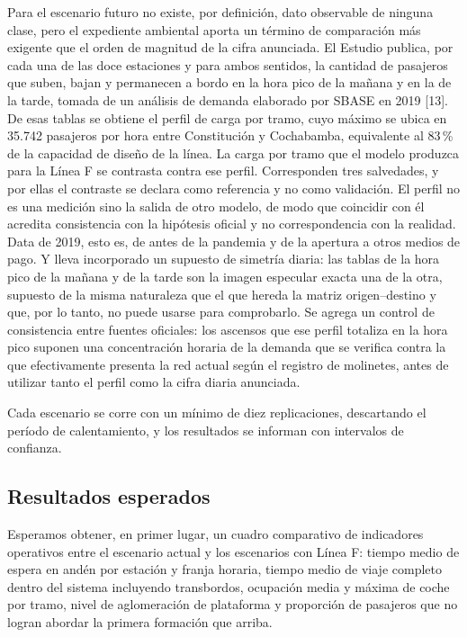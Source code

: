 \documentclass{article}
\begin{document}
Para el escenario futuro no existe, por definición, dato observable de ninguna clase, pero el expediente
ambiental aporta un término de comparación más exigente que el orden de magnitud de la cifra anunciada. El
Estudio publica, por cada una de las doce estaciones y para ambos sentidos, la cantidad de pasajeros que
suben, bajan y permanecen a bordo en la hora pico de la mañana y en la de la tarde, tomada de un análisis de
demanda elaborado por SBASE en 2019 [13]. De esas tablas se obtiene el perfil de carga por tramo, cuyo
máximo se ubica en 35.742 pasajeros por hora entre Constitución y Cochabamba, equivalente al 83\,\% de la
capacidad de diseño de la línea. La carga por tramo que el modelo produzca para la Línea F se contrasta
contra ese perfil. Corresponden tres salvedades, y por ellas el contraste se declara como referencia y no
como validación. El perfil no es una medición sino la salida de otro modelo, de modo que coincidir con él
acredita consistencia con la hipótesis oficial y no correspondencia con la realidad. Data de 2019, esto es,
de antes de la pandemia y de la apertura a otros medios de pago. Y lleva incorporado un supuesto de simetría
diaria: las tablas de la hora pico de la mañana y de la tarde son la imagen especular exacta una de la otra,
supuesto de la misma naturaleza que el que hereda la matriz origen--destino y que, por lo tanto, no puede
usarse para comprobarlo. Se agrega un control de consistencia entre fuentes oficiales: los ascensos que ese
perfil totaliza en la hora pico suponen una concentración horaria de la demanda que se verifica contra la
que efectivamente presenta la red actual según el registro de molinetes, antes de utilizar tanto el perfil
como la cifra diaria anunciada.

Cada escenario se corre con un mínimo de diez replicaciones, descartando el período de calentamiento, y los
resultados se informan con intervalos de confianza.

\subsection{Resultados esperados}

Esperamos obtener, en primer lugar, un cuadro comparativo de indicadores operativos entre el escenario
actual y los escenarios con Línea F: tiempo medio de espera en andén por estación y franja horaria, tiempo
medio de viaje completo dentro del sistema incluyendo transbordos, ocupación media y máxima de coche por
tramo, nivel de aglomeración de plataforma y proporción de pasajeros que no logran abordar la primera
formación que arriba.
\end{document}
